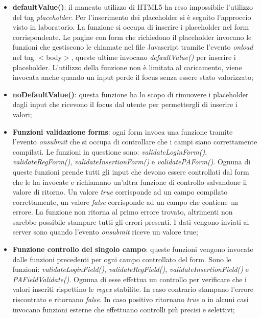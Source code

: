 \begin{itemize}
    \item \textbf{defaultValue()}: il mancato utilizzo di HTML5 ha reso impossibile l'utilizzo del tag \textit{placeholder}. Per l'inserimento dei placeholder si è seguito l'approccio visto in laboratorio. La funzione si occupa di inserire i placeholder nel form corrispondente. Le pagine con form che richiedono il placeholder invocano le funzioni che gestiscono le chiamate nel file Javascript tramite l'evento \textit{onload} nel tag  $<$body$>$, queste ultime invocano \textit{defaultValue()} per inserire i placeholder.
    L'utilizzo della funzione non è limitata al caricamento, viene invocata anche quando un input perde il focus senza essere stato valorizzato;
    
    \item \textbf{noDefaultValue()}: questa funzione ha lo scopo di rimuovere i placeholder dagli input che ricevono il focus dal utente per permettergli di inserire i valori;
    
    \item \textbf{Funzioni validazione forms}: ogni form invoca una funzione tramite l'evento \textit{onsubmit} che si occupa di controllare che i campi siano correttamente compilati. Le funzioni in questione sono: \textit{validateLoginForm()}, \textit{validateRegForm()}, \textit{validateInsertionForm()} e \textit{validatePAForm()}. Ognuna di queste funzioni prende tutti gli input che devono essere controllati dal form che le ha invocate e richiamano un'altra funzione di controllo salvandone il valore di ritorno. Un valore \textit{true} corrisponde ad un campo compilato correttamente, un valore \textit{false} corrisponde ad un campo che contiene un errore. La funzione non ritorna al primo errore trovato, altrimenti non sarebbe possibile stampare tutti gli errori presenti. I dati vengono inviati al server sono quando l'evento \textit{onsubmit} riceve un valore true;
    
    \item \textbf{Funzione controllo del singolo campo}: queste funzioni vengono invocate dalle funzioni precedenti per ogni campo controllato del form. 
    Sono le funzioni: \textit{validateLoginField()}, \textit{validateRegField()}, \textit{validateInsertionField()} e \textit{PAFieldValidate()}. Ognuna di esse effettua un controllo per verificare che i valori inseriti rispettino le \textit{regex} stabilite. In caso contrario stampano l'errore riscontrato e ritornano \textit{false}. In caso positivo ritornano \textit{true} o in alcuni casi invocano funzioni esterne che effettuano controlli più precisi e selettivi;
    

\end{itemize}
